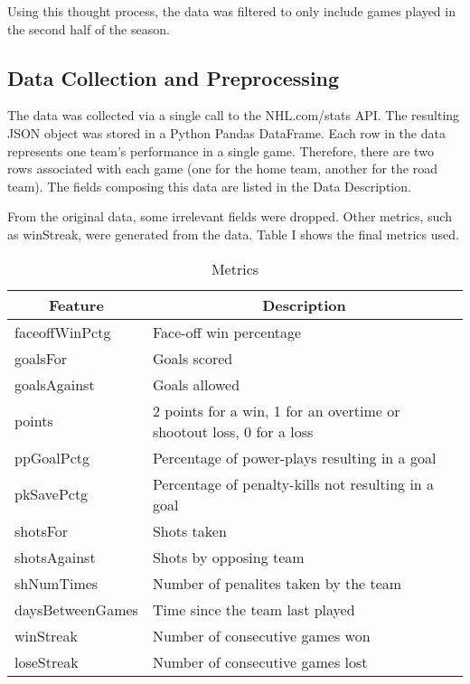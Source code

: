 \documentclass[letterpaper, 10 pt, conference]{ieeeconf}
\begin{document}
Using this thought process, the data was filtered to only include games played in the second half of the season.

\subsection{Data Collection and Preprocessing}

The data was collected via a single call to the NHL.com/stats API. The resulting JSON object was stored in a Python Pandas DataFrame. Each row in the data represents one team's performance in a single game. Therefore, there are two rows associated with each game (one for the home team, another for the road team). The fields composing this data are listed in the Data Description.

From the original data, some irrelevant fields were dropped. Other metrics, such as winStreak, were generated from the data. Table I shows the final metrics used.


\begin{table}[h]
\centering
\caption{Metrics}
\begin{tabular}{p{2.5cm}p{4cm}}

\toprule
\multicolumn{1}{c}{\textbf{Feature}} & \multicolumn{1}{c}{\textbf{Description}}                             \\ \midrule
faceoffWinPctg                       & Face-off win percentage                                              \\
goalsFor                             & Goals scored                                                         \\
goalsAgainst                         & Goals allowed                                                        \\
points                               & 2 points for a win, 1 for an overtime or shootout loss, 0 for a loss \\
ppGoalPctg                           & Percentage of power-plays resulting in a goal                        \\
pkSavePctg                           & Percentage of penalty-kills not resulting in a goal                  \\
shotsFor                             & Shots taken                                                          \\
shotsAgainst                         & Shots by opposing team                                               \\
shNumTimes                           & Number of penalites taken by the team                                \\
daysBetweenGames                     & Time since the team last played                                      \\
winStreak                            & Number of consecutive games won                                      \\
loseStreak                           & Number of consecutive games lost                                     \\ \bottomrule
\end{tabular}
\end{table}
\end{document}
